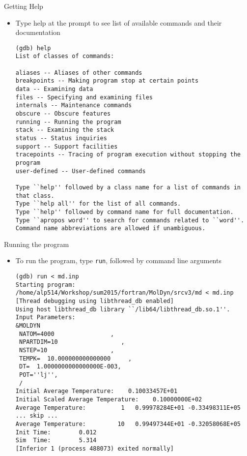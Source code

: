 \documentclass[10pt,t]{beamer}
\begin{document}
\begin{frame}[fragile]{Getting Help}
  \begin{itemize}
  \item Type help at the prompt to see list of available commands and their documentation
    \begin{lstlisting}
(gdb) help
List of classes of commands:

aliases -- Aliases of other commands
breakpoints -- Making program stop at certain points
data -- Examining data
files -- Specifying and examining files
internals -- Maintenance commands
obscure -- Obscure features
running -- Running the program
stack -- Examining the stack
status -- Status inquiries
support -- Support facilities
tracepoints -- Tracing of program execution without stopping the program
user-defined -- User-defined commands

Type ``help'' followed by a class name for a list of commands in that class.
Type ``help all'' for the list of all commands.
Type ``help'' followed by command name for full documentation.
Type ``apropos word'' to search for commands related to ``word''.
Command name abbreviations are allowed if unambiguous.
    \end{lstlisting}
  \end{itemize}
\end{frame}

\begin{frame}[fragile]{Running the program}
  \begin{itemize}
  \item To run the program, type \lstinline|run|, followed by command line arguments
    \begin{lstlisting}
(gdb) run < md.inp
Starting program: /home/alp514/Workshop/sum2015/fortran/MolDyn/srcv3/md < md.inp
[Thread debugging using libthread_db enabled]
Using host libthread_db library ``/lib64/libthread_db.so.1''.
Input Parameters:
&MOLDYN
 NATOM=4000                ,
 NPARTDIM=10                  ,
 NSTEP=10                  ,
 TEMPK=  10.000000000000000     ,
 DT=  1.0000000000000000E-003,
 POT=''lj'',
 /
Initial Average Temperature:    0.10033457E+01
Initial Scaled Average Temperature:    0.10000000E+02
Average Temperature:          1   0.99978284E+01 -0.33498311E+05
... skip ...
Average Temperature:         10   0.99497344E+01 -0.32058068E+05
Init Time:        0.012
Sim  Time:        5.314
[Inferior 1 (process 488073) exited normally]
    \end{lstlisting}
  \end{itemize}
\end{frame}
\end{document}
